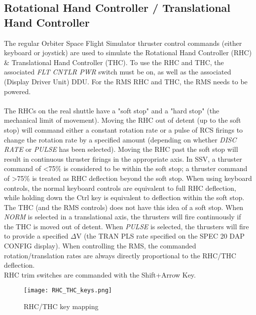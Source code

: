 \documentclass[Space_Shuttle_Vessel_Manual.tex]{subfiles}
\begin{document}
\begin{multicols*}{2}
\subsection{Rotational Hand Controller / Translational Hand Controller}
The regular Orbiter Space Flight Simulator thruster control commands (either keyboard or joystick) are used to simulate the Rotational Hand Controller (RHC) \& Translational Hand Controller (THC). To use the RHC and THC, the associated \textit{FLT CNTLR PWR} switch must be on, as well as the associated (Display Driver Unit) DDU. For the RMS RHC and THC, the RMS needs to be powered.
\\
\\
The RHCs on the real shuttle have a "soft stop" and a "hard stop" (the mechanical limit of movement). Moving the RHC out of detent (up to the soft stop) will command either a constant rotation rate or a pulse of RCS firings to change the rotation rate by a specified amount (depending on whether \textit{DISC RATE} or \textit{PULSE} has been selected). Moving the RHC past the soft stop will result in continuous thruster firings in the appropriate axis. In SSV, a thruster command of <75\% is considered to be within the soft stop; a thruster command of >75\% is treated as RHC deflection beyond the soft stop. When using keyboard controls, the normal keyboard controls are equivalent to full RHC deflection, while holding down the Ctrl key is equivalent to deflection within the soft stop. The THC (and the RMS controls) does not have this idea of a soft stop. When \textit{NORM} is selected in a translational axis, the thrusters will fire continuously if the THC is moved out of detent. When \textit{PULSE} is selected, the thrusters will fire to provide a specified $\Delta$V (the TRAN PLS rate specified on the SPEC 20 DAP CONFIG display). When controlling the RMS, the commanded rotation/translation rates are always directly proportional to the RHC/THC deflection.\\
RHC trim switches are commanded with the Shift+Arrow Key.

\begin{figure}[H]
  \texttt{[image: RHC\_THC\_keys.png]}
  \caption{RHC/THC key mapping}
  \label{fig:RHC_THC_keys}
\end{figure}


\end{multicols*}
\end{document}
